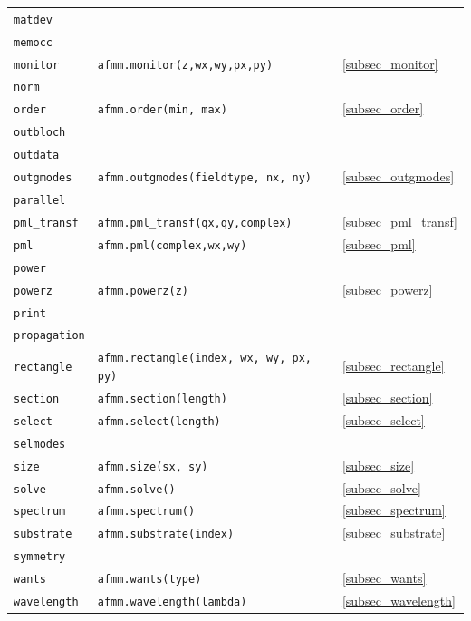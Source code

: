 \begin{footnotesize}
\begin{longtable}{lll}
\lstinline!matdev!          &\\
\lstinline!memocc!          &\\
\lstinline!monitor!         &\lstinline!afmm.monitor(z,wx,wy,px,py)!&\ref{subsec_monitor}\\
\lstinline!norm!            &\\
\lstinline!order!           &\lstinline!afmm.order(min, max)!&\ref{subsec_order}\\
\lstinline!outbloch!        &\\
\lstinline!outdata!         &\\
\lstinline!outgmodes!       &\lstinline!afmm.outgmodes(fieldtype, nx, ny)!&\ref{subsec_outgmodes}\\
\lstinline!parallel!        &\\
\lstinline!pml_transf!      &\lstinline!afmm.pml_transf(qx,qy,complex)!&\ref{subsec_pml_transf}\\
\lstinline!pml!             &\lstinline!afmm.pml(complex,wx,wy)!&\ref{subsec_pml}\\ 
\lstinline!power!           &\\
\lstinline!powerz!          &\lstinline!afmm.powerz(z)!&\ref{subsec_powerz}\\
\lstinline!print!           &\\
\lstinline!propagation!     &\\
\lstinline!rectangle!       &\lstinline!afmm.rectangle(index, wx, wy, px, py)!&\ref{subsec_rectangle}\\
\lstinline!section!         &\lstinline!afmm.section(length)!&\ref{subsec_section}\\
\lstinline!select!          &\lstinline!afmm.select(length)!&\ref{subsec_select}\\
\lstinline!selmodes!        &\\
\lstinline!size!            &\lstinline!afmm.size(sx, sy)! &\ref{subsec_size} \\
\lstinline!solve!           &\lstinline!afmm.solve()!&\ref{subsec_solve}\\
\lstinline!spectrum!        &\lstinline!afmm.spectrum()!&\ref{subsec_spectrum}\\
\lstinline!substrate!       &\lstinline!afmm.substrate(index)! &\ref{subsec_substrate} \\
\lstinline!symmetry!        &\\
\lstinline!wants!           &\lstinline!afmm.wants(type)!&\ref{subsec_wants}\\
\lstinline!wavelength!      &\lstinline!afmm.wavelength(lambda)!&\ref{subsec_wavelength}\\
\hline
\end{longtable}
\end{footnotesize}

